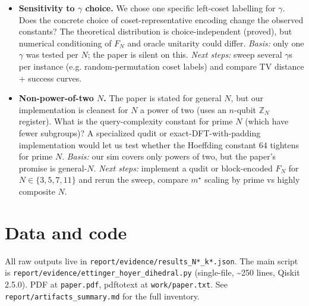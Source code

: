 \documentclass[11pt]{article}
\begin{document}
\begin{itemize}
    with $N$. \emph{Next steps:} implement Kuperberg's sieve on $N=64$
    and compare oracle count + wall time to our exhaustive argmax.
  \item[Q4] \textbf{Sensitivity to $\gamma$ choice.} We chose one specific
    left-coset labelling for $\gamma$. Does the concrete choice of
    coset-representative encoding change the observed constants? The
    theoretical distribution is choice-independent (proved), but numerical
    conditioning of $F_N$ and oracle unitarity could differ. \emph{Basis:}
    only one $\gamma$ was tested per $N$; the paper is silent on this. \emph{Next
    steps:} sweep several $\gamma$s per instance (e.g. random-permutation
    coset labels) and compare TV distance + success curves.
  \item[Q5] \textbf{Non-power-of-two $N$.} The paper is stated for general
    $N$, but our implementation is cleanest for $N$ a power of two (uses an
    $n$-qubit $\mathbb{Z}_N$ register). What is the query-complexity constant
    for prime $N$ (which have fewer subgroups)? A specialized qudit or
    exact-DFT-with-padding implementation would let us test whether the
    Hoeffding constant $64$ tightens for prime $N$. \emph{Basis:} our sim
    covers only powers of two, but the paper's promise is general-$N$.
    \emph{Next steps:} implement a qudit or block-encoded $F_N$ for $N\in\{3,5,7,11\}$
    and rerun the sweep, compare $m^{\star}$ scaling by prime vs
    highly composite $N$.
\end{itemize}

\section*{Data and code}
All raw outputs live in \texttt{report/evidence/results\_N*\_k*.json}.
The main script is \texttt{report/evidence/ettinger\_hoyer\_dihedral.py}
(single-file, \textasciitilde{}250 lines, Qiskit 2.5.0). PDF at \texttt{paper.pdf},
pdftotext at \texttt{work/paper.txt}. See \texttt{report/artifacts\_summary.md}
for the full inventory.
\end{document}
